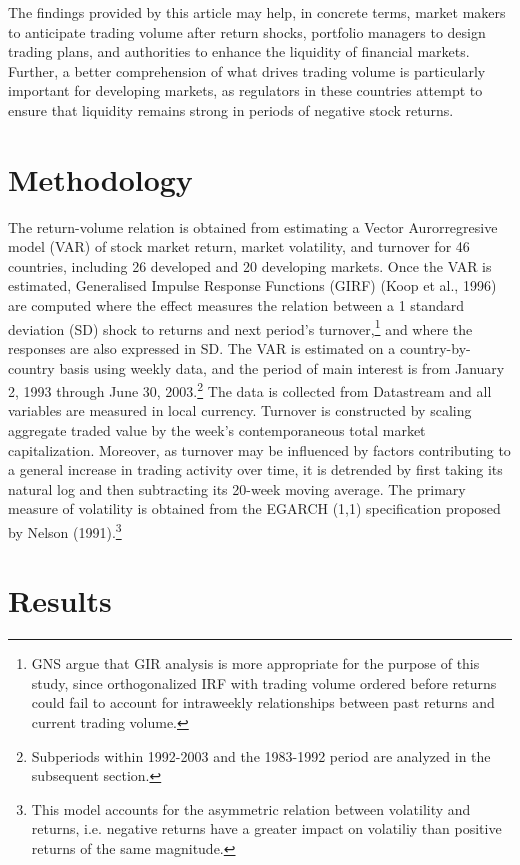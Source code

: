 \documentclass[final,3p,times,twocolumn]{elsarticle}
\begin{document}
The findings provided by this article may help, in concrete terms, market makers to anticipate trading volume after return shocks, portfolio managers to design trading plans, and authorities to enhance the liquidity of financial markets. Further, a better comprehension of what drives trading volume is particularly important for developing markets, as regulators in these countries attempt to ensure that liquidity remains strong in periods of negative stock returns.\par

\section{Methodology}

The return-volume relation is obtained from estimating a Vector Aurorregresive model (VAR) of stock market return, market volatility, and turnover for 46 countries, including 26 developed and 20 developing markets. Once the VAR is estimated, Generalised Impulse Response Functions (GIRF) (Koop et al., 1996) are computed where the effect measures the relation between a 1 standard deviation (SD) shock to returns and next period’s turnover,\footnote{GNS argue that GIR analysis is more appropriate for the purpose of this study, since orthogonalized IRF with trading volume ordered before returns could fail to account for intraweekly relationships between past returns and current trading volume.} and where the responses are also expressed in SD. The VAR is estimated on a country-by-country basis using weekly data, and the period of main interest is from January 2, 1993 through June 30, 2003.\footnote{Subperiods within 1992-2003 and the 1983-1992 period are analyzed in the subsequent section.} The data is collected from Datastream and all variables are measured in local currency. Turnover is constructed by scaling aggregate traded value by the week's contemporaneous total market capitalization. Moreover, as turnover may be influenced by factors contributing to a general increase in trading activity over time, it is detrended by first taking its natural log and then subtracting its 20-week moving average. The primary measure of volatility is obtained from the EGARCH (1,1) specification proposed by Nelson (1991).\footnote{This model accounts for the asymmetric relation between volatility and returns, i.e. negative returns have a greater impact on volatiliy than positive returns of the same magnitude.}\par


\section{Results}
\end{document}
